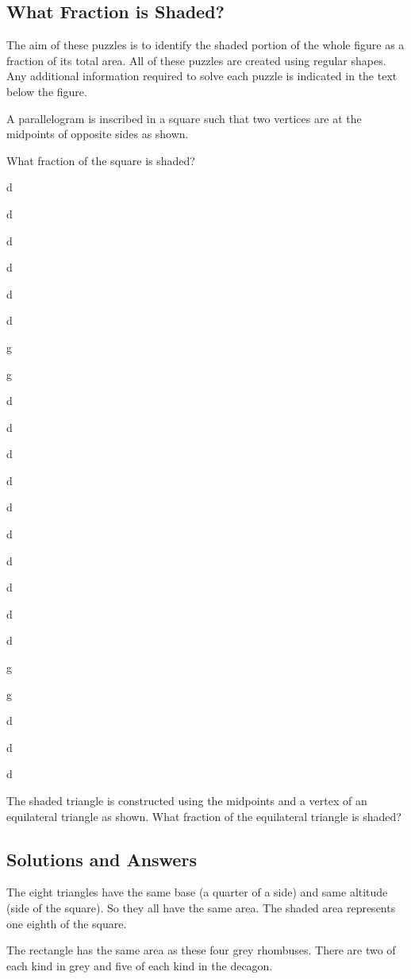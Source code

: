 \documentclass{tarquinst}
\begin{document}
	
\begin{changemargin}	
\chapter{What Fraction is Shaded?}	


The aim of these puzzles is to identify the shaded portion of the
whole figure as a fraction of its total area. All of these puzzles are
created using regular shapes. Any additional information required
to solve each puzzle is indicated in the text below the figure.
\end{changemargin}

\newpage 

\noindent 
{}\quad 
A parallelogram is inscribed in a square such that two vertices are at
the midpoints of opposite sides as shown.

\noindent
What fraction of the square is shaded?

d

d

d

d

d

d

g

g

d

d

d

d

d

d

d

d

d


d

g

g

d

d

d


\newpage

\noindent
{}\quad
The shaded triangle is constructed using the midpoints and a vertex
of an equilateral triangle as shown.
What fraction of the equilateral triangle is shaded?

\newpage 

\begin{changemargin}
\chapter{Solutions and Answers}
\end{changemargin}

\newpage

\noindent 
{}\quad 
The eight triangles have the same base (a quarter of a side) and same altitude (side of
the square). So they all have the same area. The shaded area represents one eighth of the
square.
	
\newpage

\noindent 
{}\quad 
The rectangle has the same area as these
four grey rhombuses. There are two of
each kind in grey and five of each kind in
the decagon.

	
\end{document}
